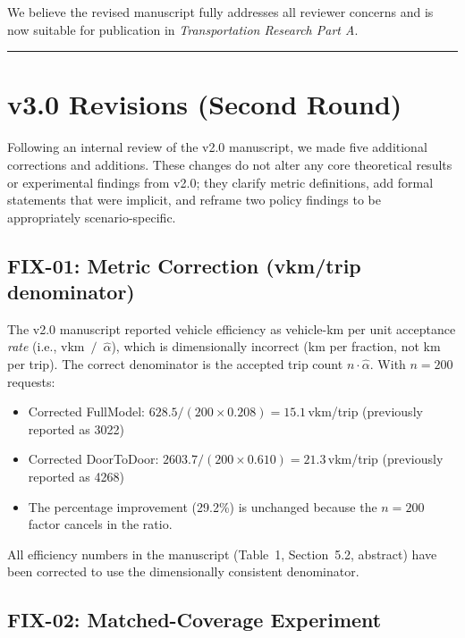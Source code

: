 \documentclass[12pt]{article}
\begin{document}
We believe the revised manuscript fully addresses all reviewer concerns and is now suitable for publication in \textit{Transportation Research Part A}.

\bigskip\hrule\bigskip

\section*{v3.0 Revisions (Second Round)}

Following an internal review of the v2.0 manuscript, we made five additional
corrections and additions. These changes do not alter any core theoretical
results or experimental findings from v2.0; they clarify metric definitions,
add formal statements that were implicit, and reframe two policy findings to
be appropriately scenario-specific.

\subsection*{FIX-01: Metric Correction (vkm/trip denominator)}

The v2.0 manuscript reported vehicle efficiency as vehicle-km per unit acceptance
\emph{rate} (i.e., vkm~$/$~$\hat\alpha$), which is dimensionally incorrect
(km per fraction, not km per trip). The correct denominator is the accepted trip
count $n \cdot \hat\alpha$. With $n = 200$ requests:
\begin{itemize}
  \item Corrected FullModel: $628.5 / (200 \times 0.208) = \mathbf{15.1}$\,vkm/trip
        (previously reported as 3022)
  \item Corrected DoorToDoor: $2603.7 / (200 \times 0.610) = \mathbf{21.3}$\,vkm/trip
        (previously reported as 4268)
  \item The percentage improvement (29.2\%) is unchanged because the $n = 200$
        factor cancels in the ratio.
\end{itemize}
All efficiency numbers in the manuscript (Table~1, Section~5.2, abstract) have
been corrected to use the dimensionally consistent denominator.

\subsection*{FIX-02: Matched-Coverage Experiment}
\end{document}
